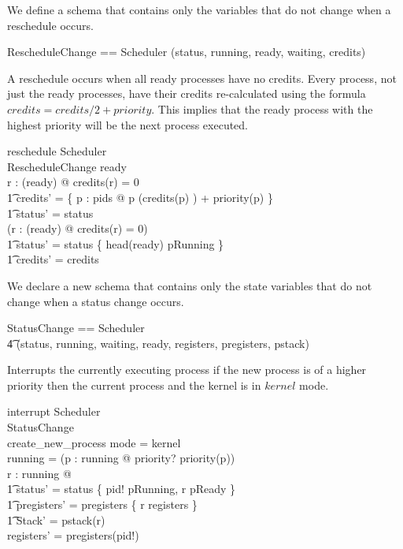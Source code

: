 We define a schema that contains only the variables that do not change
when a reschedule occurs.

\begin{zed}
    RescheduleChange == Scheduler \hide (status, running, ready, waiting, credits)
\end{zed}

A reschedule occurs when all ready processes have no credits. Every
process, not just the ready processes, have their credits
re-calculated using the formula $credits = credits/2 + priority$. This
implies that the ready process with the highest priority will be the
next process executed.

\begin{schema}{reschedule}
    \Delta Scheduler\\
    \Xi RescheduleChange
\where
    ready \neq \emptyset\\
    \forall r : \ran(ready) @ credits(r) = 0 \implies\\
	\t1 credits' = \{ p : pids @ p \mapsto (credits(p) ) + priority(p) \} \land\\
	\t1 status' = status\\
    \lnot (\forall r : \ran(ready) @ credits(r) = 0) \implies\\
        \t1 status' = status \oplus \{ head(ready) \mapsto pRunning \} \land\\ 
	\t1 credits' = credits
\end{schema}

We declare a new schema that contains only the state variables that do
not change when a status change occurs.

\begin{zed}
    StatusChange == Scheduler \hide\\
	\t4 (status, running, waiting, ready, registers, pregisters, pstack)
\end{zed}

Interrupts the currently executing process if the new process is of a
higher priority then the current process and the kernel is in $kernel$
mode.

\begin{schema}{interrupt}
    \Delta Scheduler\\
    \Xi StatusChange\\
    create\_new\_process
\where
    mode = kernel\\
    running = \emptyset \lor (\exists p : running @ priority? \geq priority(p))\\
    \exists r : running @\\
	\t1 status' = status \oplus \{ pid! \mapsto pRunning, r \mapsto pReady \} \land\\
	\t1 pregisters' = pregisters \oplus \{ r \mapsto registers \} \land\\
        \t1 \theta Stack' = pstack(r)\\
    registers' = pregisters(pid!)
\end{schema}

